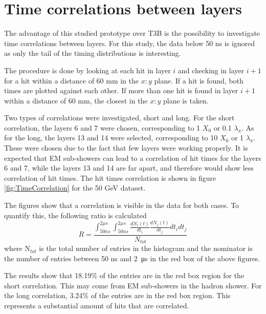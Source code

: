 \section{Time correlations between layers}

The advantage of this studied prototype over T3B is the possibility to investigate time correlations between layers. For this study, the data below 50 ns is ignored as only the tail of the timing distributions is interesting.

The procedure is done by looking at each hit in layer $i$ and checking in layer $i+1$ for a hit within a distance of 60 mm in the $x:y$ plane. If a hit is found, both times are plotted against each other. If more than one hit is found in layer $i+1$ within a distance of 60 mm, the closest in the $x:y$ plane is taken.

Two types of correlations were investigated, short and long. For the short correlation, the layers 6 and 7 were chosen, corresponding to 1 $X_0$ or 0.1 $\lambda_{\pi}$. As for the long, the layers 13 and 14 were selected, corresponding to 10 $X_0$ or 1 $\lambda_{\pi}$. These were chosen due to the fact that few layers were working properly. It is expected that EM sub-showers can lead to a correlation of hit times for the layers 6 and 7, while the layers 13 and 14 are far apart, and therefore would show less correlation of hit times. The hit times correlation is shown in figure \ref{fig:TimeCorrelation} for the 50 GeV dataset.

The figures show that a correlation is visible in the data for both cases. To quantify this, the following ratio is calculated
\begin{equation}\label{eq:CorrelCalcul}
	R = \frac{\int_{50 ns}^{2 \mu s} \int_{50 ns}^{2 \mu s} \frac{dN_i(t)}{dt_i} \frac{dN_j(t)}{dt_j} dt_i dt_j}{N_{tot}}
\end{equation}
where N$_{tot}$ is the total number of entries in the histogram and the nominator is the number of entries between 50 ns and \SI{2}{\micro\second} in the red box of the above figures.

The results show that 18.19\% of the entries are in the red box region for the short correlation. This may come from EM sub-showers in the hadron shower. For the long correlation, 3.24\% of the entries are in the red box region. This represents a substantial amount of hits that are correlated.

